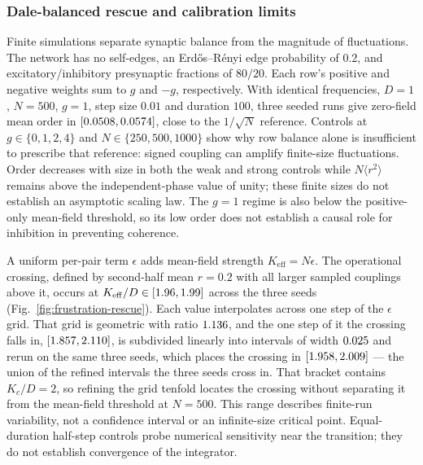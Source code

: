 \documentclass{article}
\begin{document}
\subsubsection*{Dale-balanced rescue and calibration limits}
Finite simulations separate synaptic balance from the magnitude of fluctuations.
The network has no self-edges, an Erd\H{o}s--R\'enyi edge probability of $0.2$,
and excitatory/inhibitory presynaptic fractions of $80/20$.  Each row's positive
and negative weights sum to $g$ and $-g$, respectively.  With identical
frequencies, $D=1$, $N=500$, $g=1$, step size $0.01$ and duration $100$, three
seeded runs give zero-field mean order in
$[0.0508,0.0574]$, close to the
$1/\sqrt{N}$ reference.  Controls at $g\in\{0,1,2,4\}$ and
$N\in\{250,500,1000\}$ show why row balance alone is insufficient to prescribe
that reference: signed coupling can amplify finite-size fluctuations.
Order decreases with size in both the weak and strong controls while
$N\langle r^2\rangle$ remains above the independent-phase value of unity;
these finite sizes do not establish an asymptotic scaling law.
The $g=1$ regime is also below the positive-only mean-field threshold, so its
low order does not establish a causal role for inhibition in preventing coherence.

A uniform per-pair term $\epsilon$ adds mean-field strength
$K_{\mathrm{eff}}=N\epsilon$.  The operational crossing, defined by second-half
mean $r=0.2$ with all larger sampled couplings above it, occurs at
$K_{\mathrm{eff}}/D\in[1.96,1.99]$
across the three seeds (Fig.~\ref{fig:frustration-rescue}).  Each value
interpolates across one step of the $\epsilon$ grid.  That grid is geometric
with ratio $1.136$, and the one step of it the crossing falls
in, $[1.857,2.110]$, is subdivided linearly into
intervals of width $0.025$ and rerun on the same three
seeds, which places the crossing in
$[1.958,2.009]$ --- the union of the refined
intervals the three seeds cross in.  That bracket contains $K_c/D=2$, so refining the grid
tenfold locates the crossing without separating it from the mean-field
threshold at $N=500$.  This range describes
finite-run variability, not a confidence interval or an infinite-size critical
point.  Equal-duration half-step controls probe numerical sensitivity near the
transition; they do not establish convergence of the integrator.
\end{document}
